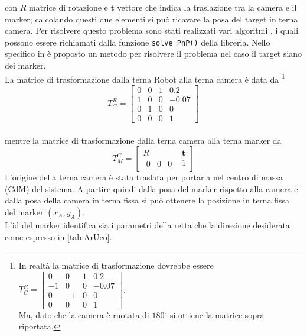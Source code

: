   con $R$ matrice di rotazione e $ \boldsymbol{t}$ vettore che indica la traslazione tra la camera e il marker; calcolando questi due elementi si può ricavare la 
  posa del target in terna camera. Per risolvere questo problema sono stati realizzati vari algoritmi \cite{marchand2015pose}, i quali possono essere richiamati dalla 
  funzione \texttt{solve\_PnP()} della libreria. Nello specifico in \cite{infinitesimal} è proposto un metodo per risolvere il problema nel caso il target siano dei
  marker. \\
  La matrice di trasformazione dalla terna Robot alla terna camera è data da \footnote{In realtà la matrice di trasformazione dovrebbe essere $T^R_C = \begin{bmatrix} 0 & 0 & 1 & 0.2 \\ -1 & 0 & 0 & -0.07 \\ 0 & -1 & 0 & 0 \\ 0 & 0 & 0 & 1 \end{bmatrix} $. \\ Ma, dato che la camera è ruotata di $180^{\circ}$ si ottiene la matrice sopra riportata. }   
\begin{equation}
T^R_C = \begin{bmatrix} 0 & 0 & 1 & 0.2 \\ 1 & 0 & 0 & -0.07 \\ 0 & 1 & 0 & 0 \\ 0 & 0 & 0 & 1 \end{bmatrix} 
\end{equation}\\ mentre la matrice di trasformazione dalla terna camera alla terna marker da 
\begin{equation}
T^C_M = \begin{bmatrix} R & \boldsymbol{t} \\ \begin{matrix} 0 & 0  & 0 \end{matrix} & 1 \end{bmatrix}
\end{equation}
L'origine della terna camera è stata traslata per portarla nel centro di massa (CdM) del sistema.
A partire quindi dalla posa del marker rispetto alla camera e dalla posa della camera in terna fissa si può ottenere la posizione in terna fissa del marker $(x_A, y_A)$.\\
L'id del marker identifica sia i parametri della retta che la direzione desiderata come espresso in 
\autoref{tab:ArUco}.
